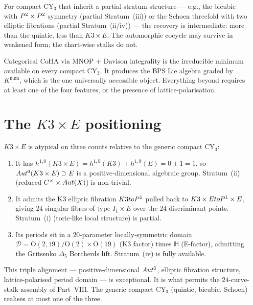 \begin{remark}
\label{rem:generic-compact}
For compact CY$_3$ that inherit a partial stratum structure --- e.g.,
the bicubic with $P^2 \times P^2$ symmetry (partial Stratum~(iii))
or the Schoen threefold with two elliptic fibrations (partial
Stratum~(ii/iv)) --- the recovery is intermediate: more than the
quintic, less than $K3 \times E$. The automorphic cocycle may survive
in weakened form; the chart-wise stalks do not.

Categorical CoHA via MNOP + Davison integrality is the irreducible
minimum available on every compact CY$_3$. It produces the BPS Lie
algebra graded by $K^{\mathrm{num}}$, which is the one universally
accessible object. Everything beyond requires at least one of the four
features, or the presence of lattice-polarisation.
\end{remark}

\section{The $K3 \times E$ positioning}
\label{sec:k3e-positioning}

$K3 \times E$ is atypical on three counts relative to the generic
compact CY$_3$:

\begin{enumerate}[leftmargin=2em]
\item It has $h^{1,0}(K3 \times E) = h^{1,0}(K3) + h^{1,0}(E) = 0 + 1
  = 1$, so $Aut^0(K3\times E) \supset E$ is a positive-dimensional
  algebraic group. Stratum~(ii) (reduced $C^\times \times Aut(X)$)
  is non-trivial.
\item It admits the K3 elliptic fibration $K3 to P^1$ pulled back to
  $K3 \times E to P^1 \times E$, giving $24$ singular fibres of type
  $I_1 \times E$ over the $24$ discriminant points. Stratum~(i)
  (toric-like local structure) is partial.
\item Its periods sit in a $20$-parameter locally-symmetric domain
  $\mathcal{D} = \mathrm{O}(2,19) / \mathrm{O}(2) \times \mathrm{O}(19)$
  (K3 factor) times $\mathbb{H}$ (E-factor), admitting the
  Gritsenko $\Delta_5$ Borcherds lift. Stratum~(iv) is fully available.
\end{enumerate}

This triple alignment --- positive-dimensional $Aut^0$, elliptic
fibration structure, lattice-polarised period domain --- is exceptional.
It is what permits the $24$-curve-stalk assembly of Part~VIII. The
generic compact CY$_3$ (quintic, bicubic, Schoen) realises at most one
of the three.

